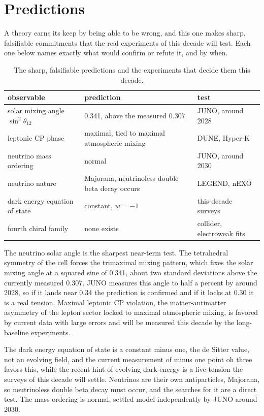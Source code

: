 \section{Predictions}

A theory earns its keep by being able to be wrong, and this one makes sharp, falsifiable commitments that the real
experiments of this decade will test. Each one below names exactly what would confirm or refute it, and by when.

\begin{table}[ht]
\centering
\begin{tabular}{@{}lll@{}}
\toprule
observable & prediction & test \\
\midrule
solar mixing angle $\sin^2\theta_{12}$ & 0.341, above the measured 0.307 & JUNO, around 2028 \\
leptonic CP phase & maximal, tied to maximal atmospheric mixing & DUNE, Hyper-K \\
neutrino mass ordering & normal & JUNO, around 2030 \\
neutrino nature & Majorana, neutrinoless double beta decay occurs & LEGEND, nEXO \\
dark energy equation of state & constant, $w = -1$ & this-decade surveys \\
fourth chiral family & none exists & collider, electroweak fits \\
\bottomrule
\end{tabular}
\caption{The sharp, falsifiable predictions and the experiments that decide them this decade.}
\label{tab:predictions}
\end{table}

The neutrino solar angle is the sharpest near-term test. The tetrahedral symmetry of the cell forces the trimaximal
mixing pattern, which fixes the solar mixing angle at a squared sine of 0.341, about two standard deviations above the
currently measured 0.307. JUNO measures this angle to half a percent by around 2028, so if it lands near 0.34 the
prediction is confirmed and if it locks at 0.30 it is a real tension. Maximal leptonic CP violation, the
matter-antimatter asymmetry of the lepton sector locked to maximal atmospheric mixing, is favored by current data with
large errors and will be measured this decade by the long-baseline experiments.

The dark energy equation of state is a constant minus one, the de Sitter value, not an evolving field, and the current
measurement of minus one point oh three favors this, while the recent hint of evolving dark energy is a live tension the
surveys of this decade will settle. Neutrinos are their own antiparticles, Majorana, so neutrinoless double beta decay
must occur, and the searches for it are a direct test. The mass ordering is normal, settled model-independently by JUNO
around 2030.

